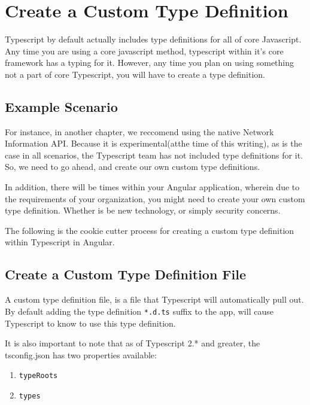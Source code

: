 \chapter{ Create a Custom Type Definition }
Typescript by default actually includes type definitions for all of core
Javascript. Any time you are using a core javascript method, typescript
within it's core framework has a typing for it. However, any time you
plan on using something not a part of core Typescript, you will have to
create a type definition. 

\section{Example Scenario}
For instance, in another chapter, we reccomend using the native Network 
Information API. Because it is experimental(atthe time of this writing),
as is the case in all scenarios, the Typescript team has not included 
type definitions for it. So, we need to go ahead, and create our own 
custom type definitions. 

In addition, there will be times within your Angular application, wherein 
due to the requirements of your organization, you might need to create your 
own custom type definition. Whether is be new technology, or simply security
concerns. 

The following is the cookie cutter process for creating a custom type 
definition within Typescript in Angular. 

\section{Create a Custom Type Definition File}
A custom type definition file, is a file that Typescript will automatically 
pull out. By default adding the type definition \lstinline{*.d.ts} suffix to
the app, will cause Typescript to know to use this type definition.

It is also important to note that as of Typescript 2.* and greater, the
tsconfig.json has two properties available: 
\begin{enumerate}
  \item \lstinline{typeRoots}
  \item \lstinline{types}
\end{enumerate}

